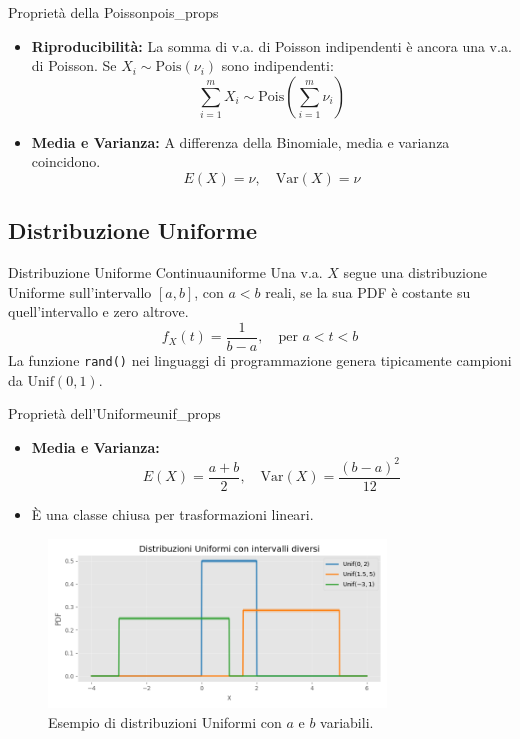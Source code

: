 \begin{proposizione}{Proprietà della Poisson}{pois_props}
\begin{itemize}
    \item \textbf{Riproducibilità:} La somma di v.a. di Poisson indipendenti è ancora una v.a. di Poisson. Se \(X_i \sim \text{Pois}(\nu_i)\) sono indipendenti:
    \[ \sum_{i=1}^{m} X_i \sim \text{Pois}\left(\sum_{i=1}^{m} \nu_i\right) \text{} \]
    \item \textbf{Media e Varianza:} A differenza della Binomiale, media e varianza coincidono.
    \[ E(X) = \nu, \quad \text{Var}(X) = \nu \text{} \]
\end{itemize}
\end{proposizione}

\subsection{Distribuzione Uniforme}

\begin{definizione}{Distribuzione Uniforme Continua}{uniforme}
Una v.a. \(X\) segue una distribuzione Uniforme sull'intervallo \([a,b]\), con \(a<b\) reali, se la sua PDF è costante su quell'intervallo e zero altrove.
\[
f_X(t) = \frac{1}{b-a}, \quad \text{per } a < t < b \text{}
\]
La funzione \texttt{rand()} nei linguaggi di programmazione genera tipicamente campioni da \(\text{Unif}(0,1)\).
\end{definizione}

\begin{proposizione}{Proprietà dell'Uniforme}{unif_props}
\begin{itemize}
    \item \textbf{Media e Varianza:}
    \[ E(X) = \frac{a+b}{2}, \quad \text{Var}(X) = \frac{(b-a)^2}{12} \]
    \item È una classe chiusa per trasformazioni lineari.
\end{itemize}
\end{proposizione}

\begin{figure}[H]
    \centering
    \includegraphics[width=0.8\textwidth]{images/uniforme.png}
    \caption{Esempio di distribuzioni Uniformi con \(a\) e \(b\) variabili.}
    \label{fig:uniforme}
\end{figure}

